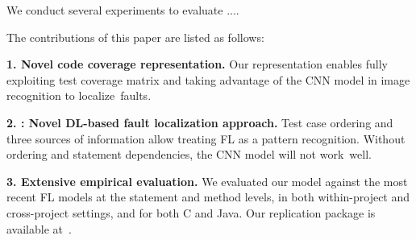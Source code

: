 We conduct several experiments to evaluate {\tool}....


The contributions of this paper are listed as follows:

{\bf 1. Novel code coverage representation.} Our representation
enables fully exploiting test coverage matrix and taking advantage of
the CNN model in image recognition to localize~faults.

{\bf 2. {\tool}: Novel DL-based fault localization approach.} Test
case ordering and three sources of information allow treating FL as a
pattern recognition. Without ordering and statement dependencies, the
CNN model will not work~well.

{\bf 3. Extensive empirical evaluation.} We evaluated our model
against the most recent FL models at the statement and method levels,
in both within-project and cross-project settings, and for both C and
Java. Our replication package is available
at~\cite{FaultLocalization2021}.


